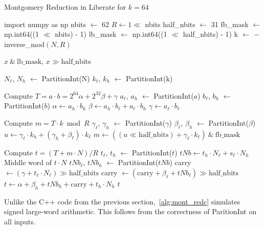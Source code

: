 \documentclass[../fheimpl.tex]{subfiles}
\begin{document}
\begin{algorithm}
	\caption{Montgomery Reduction in Liberate for $k=64$}\label{alg:mont_redc}
	\begin{algorithmic}[1]
		\State import numpy as np
		\State nbits $\gets$ 62
		\State $R \gets 1\ll$ nbits
		\State half\_nbits $\gets$ 31
		\State fb\_mask $\gets$ np.int64((1 $\ll$ nbits) - 1)
		\State lb\_mask $\gets$ np.int64((1 $\ll$ half\_nbits) - 1)
		\State k $\gets$ $-$inverse\_mod$(N, R)$
		
		\State \Return $x\ \&\ \mathrm{lb\_mask}$, $x \gg \mathrm{half\_nbits}$
		\EndProcedure
		
		\State $N_\ell$, $N_h$ $\gets$ PartitionInt(N)
		\State $k_\ell$, $k_h$ $\gets$ PartitionInt(k)
		
		\State \Comment Compute $T=a\cdot b=2^{64}\alpha + 2^{32}\beta + \gamma$
		\State $a_\ell$, $a_h$ $\gets$ PartitionInt($a$)
		\State $b_\ell$, $b_h$ $\gets$ PartitionInt($b$)
		\State $\alpha \gets a_h\cdot b_h$
		\State $\beta \gets a_h\cdot b_\ell + a_\ell\cdot b_h$
		\State $\gamma \gets a_\ell\cdot b_\ell$
		
		\State \Comment Compute $m=T\cdot k \bmod R$
		\State $\gamma_\ell$, $\gamma_h$ $\gets$ PartitionInt($\gamma$)
		\State $\beta_\ell$, $\beta_h$ $\gets$ PartitionInt($\beta$)
		\State $u \gets \gamma_\ell\cdot k_h+(\gamma_h+\beta_\ell)\cdot k_\ell$
		\State $m \gets ((u \ll \mathrm{half\_nbits})+\gamma_\ell\cdot k_\ell)\ \&\ \mathrm{fb\_mask}$
		
		\State \Comment Compute $t = (T+m\cdot N) / R$
		\State $t_\ell$, $t_h$ $\gets$ PartitionInt($t$)
		\State $tNb \gets t_h\cdot N_\ell + s_\ell\cdot N_h$
		\Comment Middle word of $t\cdot N$
		\State $tNb_\ell$, $tNb_h$ $\gets$ PartitionInt($tNb$)
		\State carry $\gets (\gamma + t_\ell\cdot N_\ell) \gg \mathrm{half\_nbits}$
		\State carry $\gets (\mathrm{carry} + \beta_\ell + tNb_\ell) \gg \mathrm{half\_nbits}$
		\State $t\gets \alpha+\beta_h+tNb_h+\mathrm{carry}+t_h\cdot N_h$
		\State \Return $t$
		\EndProcedure
	\end{algorithmic}
\end{algorithm}

Unlike the C++ code from the previous section,~\cref{alg:mont_redc} simulates signed large-word arithmetic. This follows from the correctness of \textsf{ParitionInt} on all inputs.
\end{document}
